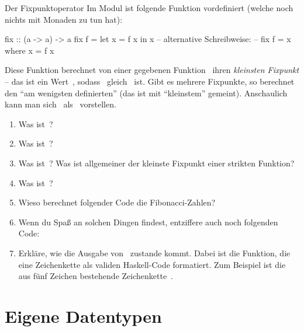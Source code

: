 \documentclass{uebblatt}
\begin{document}
\begin{aufgabe}{Der Fixpunktoperator}
Im Modul  ist folgende Funktion vordefiniert
(welche noch nichts mit Monaden zu tun hat):
\begin{haskellcode}
fix :: (a -> a) -> a
fix f = let x = f x in x
-- alternative Schreibweise:
-- fix f = x where x = f x
\end{haskellcode}
Diese Funktion berechnet von einer gegebenen Funktion~ ihren
\emph{kleinsten Fixpunkt} -- das ist ein Wert~,
sodass~ gleich~ ist. Gibt es mehrere
Fixpunkte, so berechnet~ den "`am wenigsten
definierten"' (das ist mit "`kleinstem"' gemeint). Anschaulich kann man
sich~ als~ vorstellen.

\begin{enumerate}
\item Was ist~?
\item Was ist~?
\item Was ist~? Was ist allgemeiner der kleinste Fixpunkt
einer strikten Funktion?
\item Was ist~?
\item Wieso berechnet folgender Code die Fibonacci-Zahlen?
\item Wenn du Spaß an solchen Dingen findest, entziffere auch noch folgenden Code:
\item Erkläre, wie die Ausgabe von~ zustande kommt.
Dabei ist  die Funktion, die
eine Zeichenkette als validen Haskell-Code formatiert. Zum Beispiel ist
 die aus fünf Zeichen bestehende
Zeichenkette~.
\end{enumerate}
\end{aufgabe}


\section{Eigene Datentypen}
\end{document}
